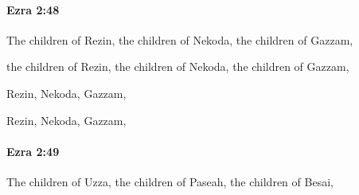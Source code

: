 		\paragraph{Ezra 2:48} %
			\label{EZRA-2-48}

			The children of Rezin, the children of Nekoda, the children of Gazzam,

			\begin{versebox}
					\item[BHS] 
					\item[LXX] 
					\item[ASV] the children of Rezin, the children of Nekoda, the children of Gazzam,
					\item[NIV] Rezin, Nekoda, Gazzam,
					\item[NRSV] Rezin, Nekoda, Gazzam,
			\end{versebox}

		\paragraph{Ezra 2:49} %
			\label{EZRA-2-49}

			The children of Uzza, the children of Paseah, the children of Besai,

